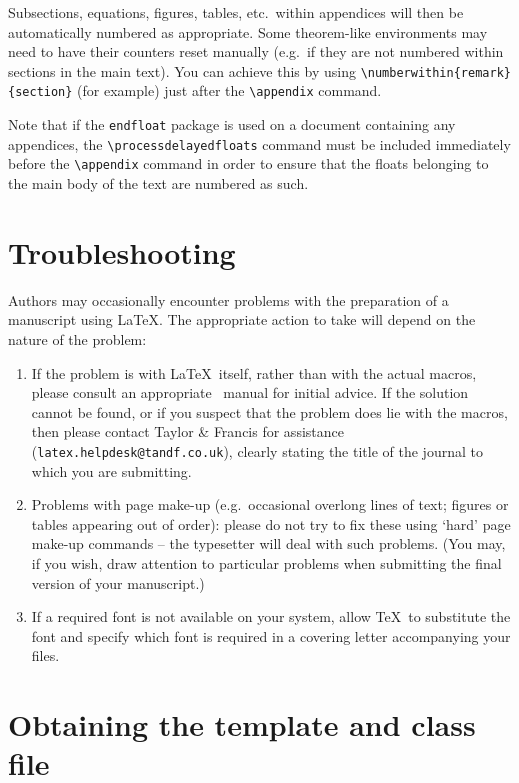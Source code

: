 \documentclass[]{interact}
\theoremstyle{plain}%
\theoremstyle{definition}
\theoremstyle{remark}
\begin{document}
\noindent Subsections, equations, figures, tables, etc.\ within appendices will then be automatically numbered as appropriate. Some theorem-like environments may need to have their counters reset manually (e.g.\ if they are not numbered within sections in the main text). You can achieve this by using \verb"\numberwithin{remark}{section}" (for example) just after the \verb"\appendix" command.

Note that if the \verb"endfloat" package is used on a document containing any appendices, the \verb"\processdelayedfloats" command must be included immediately before the \verb"\appendix" command in order to ensure that the floats belonging to the main body of the text are numbered as such.


\appendix

\section{Troubleshooting}

Authors may occasionally encounter problems with the preparation of a manuscript using \LaTeX. The appropriate action to take will depend on the nature of the problem:
\begin{enumerate}
\item[(i)] If the problem is with \LaTeX\ itself, rather than with the actual macros, please consult an appropriate \LaTeXe\ manual for initial advice. If the solution cannot be found, or if you suspect that the problem does lie with the macros, then please contact Taylor \& Francis for assistance (\texttt{latex.helpdesk@tandf.co.uk}), clearly stating the title of the journal to which you are submitting.
\item[(ii)] Problems with page make-up (e.g.\ occasional overlong lines of text; figures or tables appearing out of order): please do not try to fix these using `hard' page make-up commands -- the typesetter will deal with such problems. (You may, if you wish, draw attention to particular problems when submitting the final version of your manuscript.)
\item[(iii)] If a required font is not available on your system, allow \TeX\ to substitute the font and specify which font is required in a covering letter accompanying your files.
\end{enumerate}


\section{Obtaining the template and class file}
\end{document}
